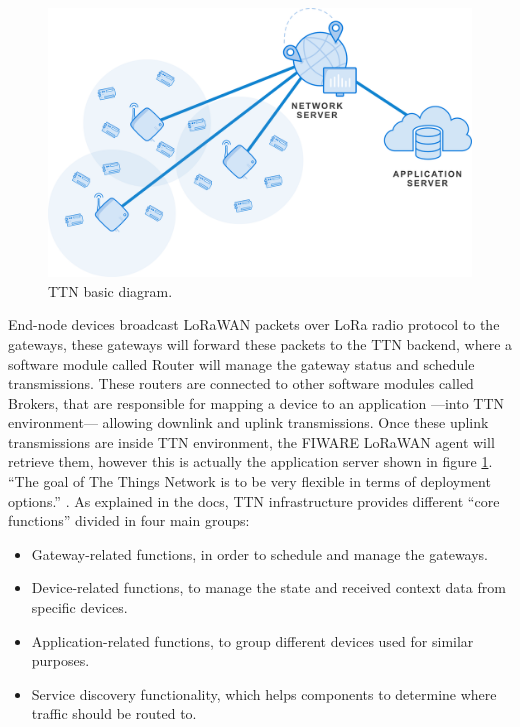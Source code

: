 \documentclass[11pt,a4paper,dvipsnames,twoside]{article}
\begin{document}
\begin{figure}[ht]
  \centering
  \includegraphics[width=.9\textwidth]{../pictures/TTN_overview.png}
  \caption{TTN basic diagram.}
  \label{fig:TTN_overview}
\end{figure}

End-node devices broadcast LoRaWAN packets over LoRa radio protocol to the gateways, these gateways will forward these packets to the TTN backend, where a software module called Router will manage the gateway status and schedule transmissions. These routers are connected to other software modules called Brokers, that are responsible for mapping a device to an application ---into TTN environment--- allowing downlink and uplink transmissions. Once these uplink transmissions are inside TTN environment, the FIWARE LoRaWAN agent will retrieve them, however this is actually the application server shown in figure \ref{fig:TTN_overview}. \enquote{The goal of The Things Network is to be very flexible in terms of deployment options.} \cite{TTN_net_arch}. As explained in the docs, TTN infrastructure provides different \enquote{core functions} divided in four main groups:

\begin{itemize}
  \item Gateway-related functions, in order to schedule and manage the gateways.
  \item Device-related functions, to manage the state and received context data from specific devices.
  \item Application-related functions, to group different devices used for similar purposes.
  \item Service discovery functionality, which helps components to determine where traffic should be routed to. 
\end{itemize}
\end{document}
